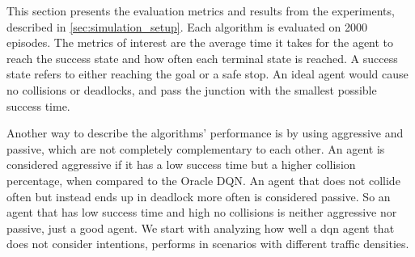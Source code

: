 This section presents the evaluation metrics and results from the experiments, described in \ref{sec:simulation_setup}. 
Each algorithm is evaluated on \num{2000} episodes. 
The metrics of interest are the average time it takes for the agent to reach the success state and how often each terminal state is reached. A success state refers to either reaching the goal or a safe stop. An ideal agent would cause no collisions or deadlocks, and pass the junction with the smallest possible success time.


Another way to describe the algorithms' performance is by using aggressive and passive, which are not completely complementary to each other. An agent is considered aggressive if it has a low success time but a higher collision percentage, when compared to the Oracle DQN. An agent that does not collide often but instead ends up in deadlock more often is considered passive. So an agent that has low success time and high no collisions is neither aggressive nor passive, just a good agent.
We start with analyzing how well a \gls{dqn} agent that does not consider intentions, performs in scenarios with different traffic densities. 


